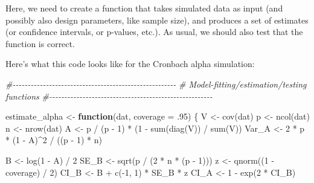 \documentclass[
]{book}
\newenvironment{Shaded}{\begin{snugshade}}{\end{snugshade}}
\newcommand{\AttributeTok}[1]{\textcolor[rgb]{0.77,0.63,0.00}{#1}}
\newcommand{\CommentTok}[1]{\textcolor[rgb]{0.56,0.35,0.01}{\textit{#1}}}
\newcommand{\ControlFlowTok}[1]{\textcolor[rgb]{0.13,0.29,0.53}{\textbf{#1}}}
\newcommand{\DecValTok}[1]{\textcolor[rgb]{0.00,0.00,0.81}{#1}}
\newcommand{\FunctionTok}[1]{\textcolor[rgb]{0.00,0.00,0.00}{#1}}
\newcommand{\NormalTok}[1]{#1}
\newcommand{\OtherTok}[1]{\textcolor[rgb]{0.56,0.35,0.01}{#1}}
\newcommand{\SpecialCharTok}[1]{\textcolor[rgb]{0.00,0.00,0.00}{#1}}
\begin{document}
Here, we need to create a function that takes simulated data as input (and possibly also design parameters, like sample size), and produces a set of estimates (or confidence intervals, or p-values, etc.). As usual, we should also test that the function is correct.

Here's what this code looks like for the Cronbach alpha simulation:

\begin{Shaded}
\begin{Highlighting}[]
\CommentTok{\#{-}{-}{-}{-}{-}{-}{-}{-}{-}{-}{-}{-}{-}{-}{-}{-}{-}{-}{-}{-}{-}{-}{-}{-}{-}{-}{-}{-}{-}{-}{-}{-}{-}{-}{-}{-}{-}{-}{-}{-}{-}{-}{-}{-}{-}{-}{-}{-}{-}{-}{-}{-}{-}{-}}
\CommentTok{\# Model{-}fitting/estimation/testing functions}
\CommentTok{\#{-}{-}{-}{-}{-}{-}{-}{-}{-}{-}{-}{-}{-}{-}{-}{-}{-}{-}{-}{-}{-}{-}{-}{-}{-}{-}{-}{-}{-}{-}{-}{-}{-}{-}{-}{-}{-}{-}{-}{-}{-}{-}{-}{-}{-}{-}{-}{-}{-}{-}{-}{-}{-}{-}}

\NormalTok{estimate\_alpha }\OtherTok{\textless{}{-}} \ControlFlowTok{function}\NormalTok{(dat, }\AttributeTok{coverage =}\NormalTok{ .}\DecValTok{95}\NormalTok{) \{}
\NormalTok{  V }\OtherTok{\textless{}{-}} \FunctionTok{cov}\NormalTok{(dat)}
\NormalTok{  p }\OtherTok{\textless{}{-}} \FunctionTok{ncol}\NormalTok{(dat)}
\NormalTok{  n }\OtherTok{\textless{}{-}} \FunctionTok{nrow}\NormalTok{(dat)}
\NormalTok{  A }\OtherTok{\textless{}{-}}\NormalTok{ p }\SpecialCharTok{/}\NormalTok{ (p }\SpecialCharTok{{-}} \DecValTok{1}\NormalTok{) }\SpecialCharTok{*}\NormalTok{ (}\DecValTok{1} \SpecialCharTok{{-}} \FunctionTok{sum}\NormalTok{(}\FunctionTok{diag}\NormalTok{(V)) }\SpecialCharTok{/} \FunctionTok{sum}\NormalTok{(V))}
\NormalTok{  Var\_A }\OtherTok{\textless{}{-}} \DecValTok{2} \SpecialCharTok{*}\NormalTok{ p }\SpecialCharTok{*}\NormalTok{ (}\DecValTok{1} \SpecialCharTok{{-}}\NormalTok{ A)}\SpecialCharTok{\^{}}\DecValTok{2} \SpecialCharTok{/}\NormalTok{ ((p }\SpecialCharTok{{-}} \DecValTok{1}\NormalTok{) }\SpecialCharTok{*}\NormalTok{ n)}
  
\NormalTok{  B }\OtherTok{\textless{}{-}} \FunctionTok{log}\NormalTok{(}\DecValTok{1} \SpecialCharTok{{-}}\NormalTok{ A) }\SpecialCharTok{/} \DecValTok{2}
\NormalTok{  SE\_B }\OtherTok{\textless{}{-}} \FunctionTok{sqrt}\NormalTok{(p }\SpecialCharTok{/}\NormalTok{ (}\DecValTok{2} \SpecialCharTok{*}\NormalTok{ n }\SpecialCharTok{*}\NormalTok{ (p }\SpecialCharTok{{-}} \DecValTok{1}\NormalTok{)))}
\NormalTok{  z }\OtherTok{\textless{}{-}} \FunctionTok{qnorm}\NormalTok{((}\DecValTok{1} \SpecialCharTok{{-}}\NormalTok{ coverage) }\SpecialCharTok{/} \DecValTok{2}\NormalTok{)}
\NormalTok{  CI\_B }\OtherTok{\textless{}{-}}\NormalTok{ B }\SpecialCharTok{+} \FunctionTok{c}\NormalTok{(}\SpecialCharTok{{-}}\DecValTok{1}\NormalTok{, }\DecValTok{1}\NormalTok{) }\SpecialCharTok{*}\NormalTok{ SE\_B }\SpecialCharTok{*}\NormalTok{ z}
\NormalTok{  CI\_A }\OtherTok{\textless{}{-}} \DecValTok{1} \SpecialCharTok{{-}} \FunctionTok{exp}\NormalTok{(}\DecValTok{2} \SpecialCharTok{*}\NormalTok{ CI\_B)}
  

\end{Highlighting}
\end{Shaded}
\end{document}
